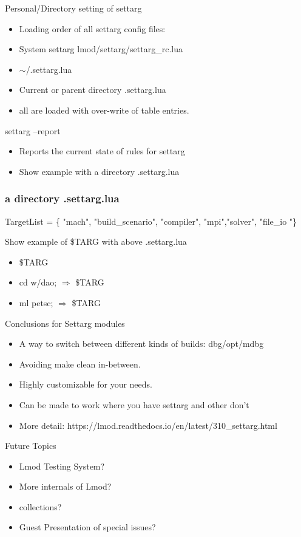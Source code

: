 \documentclass{beamer}
\begin{document}
\begin{frame}{Personal/Directory setting of settarg}
  \begin{itemize}
    \item Loading order of all settarg config files:
    \item System settarg lmod/settarg/settarg\_rc.lua
    \item $\sim$/.settarg.lua
    \item Current or parent directory .settarg.lua
    \item all are loaded with over-write of table entries.
  \end{itemize}
\end{frame}

\begin{frame}{settarg --report}
  \begin{itemize}
    \item Reports the current state of rules for settarg
    \item Show example with a directory .settarg.lua
  \end{itemize}
\end{frame}

\begin{frame}[fragile]
  \frametitle{a directory .settarg.lua}
    {\small
\begin{semiverbatim}
TargetList  = \{ "mach", "build\_scenario", "compiler", 
                   "mpi","solver", "file\_io "\}
\end{semiverbatim}
    }
\end{frame}

\begin{frame}{Show example of \$TARG with above .settarg.lua}
  \begin{itemize}
    \item \$TARG 
    \item cd w/dao; $\Rightarrow$ \$TARG
    \item ml petsc; $\Rightarrow$ \$TARG
  \end{itemize}
\end{frame}

\begin{frame}{Conclusions for Settarg modules}
  \begin{itemize}
    \item A way to switch between different kinds of builds: dbg/opt/mdbg
    \item Avoiding make clean in-between.
    \item Highly customizable for your needs.
    \item Can be made to work where you have settarg and other don't
    \item More detail: https://lmod.readthedocs.io/en/latest/310\_settarg.html
  \end{itemize}
\end{frame}

\begin{frame}{Future Topics}
  \begin{itemize}
    \item Lmod Testing System?
    \item More internals of Lmod?
    \item collections?
    \item Guest Presentation of special issues?
  \end{itemize}
\end{frame}
\end{document}
